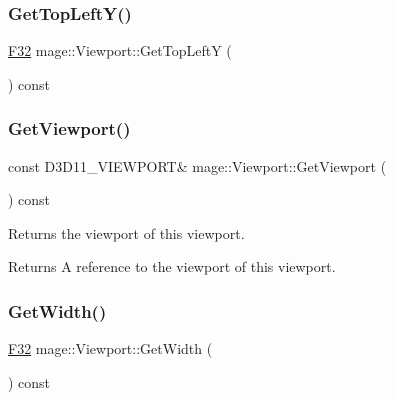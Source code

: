 \hypertarget{classmage_1_1_viewport_a9d1ddb340c775c3652c816c551653d69}{}\label{classmage_1_1_viewport_a9d1ddb340c775c3652c816c551653d69} 
\subsubsection{\texorpdfstring{Get\+Top\+Left\+Y()}{GetTopLeftY()}}
{\footnotesize\ttfamily \hyperlink{namespacemage_aa97e833b45f06d60a0a9c4fc22ae02c0}{F32} mage\+::\+Viewport\+::\+Get\+Top\+LeftY (\begin{DoxyParamCaption}{ }\end{DoxyParamCaption}) const\hspace{0.3cm}{\ttfamily [noexcept]}}

\hypertarget{classmage_1_1_viewport_ad4bb75cdfbd137182898caad913de4d1}{}\label{classmage_1_1_viewport_ad4bb75cdfbd137182898caad913de4d1} 
\subsubsection{\texorpdfstring{Get\+Viewport()}{GetViewport()}}
{\footnotesize\ttfamily const D3\+D11\+\_\+\+V\+I\+E\+W\+P\+O\+RT\& mage\+::\+Viewport\+::\+Get\+Viewport (\begin{DoxyParamCaption}{ }\end{DoxyParamCaption}) const\hspace{0.3cm}{\ttfamily [noexcept]}}

Returns the viewport of this viewport.

\begin{DoxyReturn}{Returns}
A reference to the viewport of this viewport. 
\end{DoxyReturn}
\hypertarget{classmage_1_1_viewport_a851c6322e8ee31af58309a3c0f382d10}{}\label{classmage_1_1_viewport_a851c6322e8ee31af58309a3c0f382d10} 
\subsubsection{\texorpdfstring{Get\+Width()}{GetWidth()}}
{\footnotesize\ttfamily \hyperlink{namespacemage_aa97e833b45f06d60a0a9c4fc22ae02c0}{F32} mage\+::\+Viewport\+::\+Get\+Width (\begin{DoxyParamCaption}{ }\end{DoxyParamCaption}) const\hspace{0.3cm}{\ttfamily [noexcept]}}

